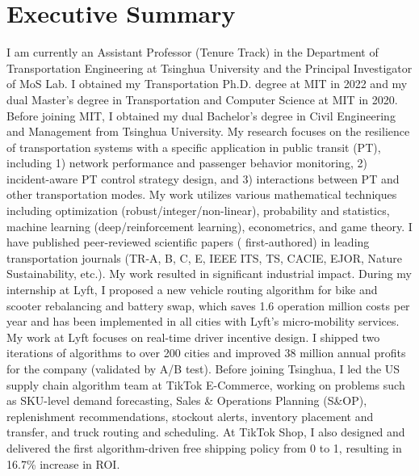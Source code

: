 \section{Executive Summary}
I am currently an Assistant Professor (Tenure Track) in the Department of Transportation Engineering at Tsinghua University and the Principal Investigator of MoS Lab. I obtained my Transportation Ph.D. degree at MIT in 2022 and my dual Master's degree in Transportation and Computer Science at MIT in 2020. Before joining MIT, I obtained my dual Bachelor's degree in Civil Engineering and Management from Tsinghua University. 
My research focuses on the {resilience of transportation systems with a specific application in public transit (PT), including 1) network performance and passenger behavior monitoring, 2) incident-aware PT control strategy design, and 3) interactions between PT and other transportation modes}. My work utilizes various mathematical techniques including optimization (robust/integer/non-linear), probability and statistics, machine learning (deep/reinforcement learning), econometrics, and game theory. I have published \textbf{{\themyCounterNum}} peer-reviewed scientific papers (\textbf{{\themyFirstAuthorNum}} first-authored) in leading transportation journals (TR-A, B, C, E, IEEE ITS, TS, CACIE, EJOR, Nature Sustainability, etc.). My work resulted in significant industrial impact. During my internship at Lyft, I proposed a new vehicle routing algorithm for bike and scooter rebalancing and battery swap, which saves 1.6 operation million costs per year and has been implemented in all cities with Lyft's micro-mobility services. My work at Lyft focuses on real-time driver incentive design. I shipped two iterations of algorithms to over 200 cities and improved 38 million annual profits for the company (validated by A/B test). Before joining Tsinghua, I led the US supply chain algorithm team at TikTok E-Commerce, working on problems such as SKU-level demand forecasting, Sales \& Operations Planning (S\&OP), replenishment recommendations, stockout alerts, inventory placement and transfer, and truck routing and scheduling. At TikTok Shop, I also designed and delivered the first algorithm-driven free shipping policy from 0 to 1, resulting in 16.7\% increase in ROI.

